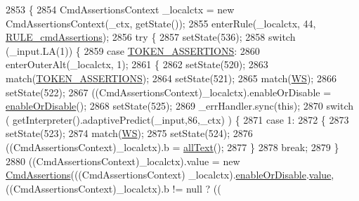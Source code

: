 \begin{DoxyCode}
2853                                                                                 \{
2854     CmdAssertionsContext \_localctx = \textcolor{keyword}{new} CmdAssertionsContext(\_ctx, getState());
2855     enterRule(\_localctx, 44, \hyperlink{classgov_1_1nasa_1_1jpf_1_1inspector_1_1client_1_1parser_1_1_console_grammar_parser_a4e8c3b6c02bd3ba2bdc1856db59019f5}{RULE\_cmdAssertions});
2856     \textcolor{keywordflow}{try} \{
2857       setState(536);
2858       \textcolor{keywordflow}{switch} (\_input.LA(1)) \{
2859       \textcolor{keywordflow}{case} \hyperlink{classgov_1_1nasa_1_1jpf_1_1inspector_1_1client_1_1parser_1_1_console_grammar_parser_a4a9f5da8ded8ec86d64dafbf8e21bb64}{TOKEN\_ASSERTIONS}:
2860         enterOuterAlt(\_localctx, 1);
2861         \{
2862         setState(520);
2863         match(\hyperlink{classgov_1_1nasa_1_1jpf_1_1inspector_1_1client_1_1parser_1_1_console_grammar_parser_a4a9f5da8ded8ec86d64dafbf8e21bb64}{TOKEN\_ASSERTIONS});
2864         setState(521);
2865         match(\hyperlink{classgov_1_1nasa_1_1jpf_1_1inspector_1_1client_1_1parser_1_1_console_grammar_parser_a6914a3a3adbc350b12a7df9d1b24abf1}{WS});
2866         setState(522);
2867         ((CmdAssertionsContext)\_localctx).enableOrDisable = \hyperlink{classgov_1_1nasa_1_1jpf_1_1inspector_1_1client_1_1parser_1_1_console_grammar_parser_aa5fa0739c6c5c8346b0476e6f75df5e4}{enableOrDisable}();
2868         setState(525);
2869         \_errHandler.sync(\textcolor{keyword}{this});
2870         \textcolor{keywordflow}{switch} ( getInterpreter().adaptivePredict(\_input,86,\_ctx) ) \{
2871         \textcolor{keywordflow}{case} 1:
2872           \{
2873           setState(523);
2874           match(\hyperlink{classgov_1_1nasa_1_1jpf_1_1inspector_1_1client_1_1parser_1_1_console_grammar_parser_a6914a3a3adbc350b12a7df9d1b24abf1}{WS});
2875           setState(524);
2876           ((CmdAssertionsContext)\_localctx).b = \hyperlink{classgov_1_1nasa_1_1jpf_1_1inspector_1_1client_1_1parser_1_1_console_grammar_parser_a9dfaeb28734c8b3f7ec5a7b81ed7d42e}{allText}();
2877           \}
2878           \textcolor{keywordflow}{break};
2879         \}
2880          ((CmdAssertionsContext)\_localctx).value =  \textcolor{keyword}{new} \hyperlink{classgov_1_1nasa_1_1jpf_1_1inspector_1_1client_1_1commands_1_1_cmd_assertions}{CmdAssertions}(((CmdAssertionsContext)
      \_localctx).\hyperlink{classgov_1_1nasa_1_1jpf_1_1inspector_1_1client_1_1parser_1_1_console_grammar_parser_aa5fa0739c6c5c8346b0476e6f75df5e4}{enableOrDisable}.\hyperlink{classgov_1_1nasa_1_1jpf_1_1inspector_1_1client_1_1parser_1_1_console_grammar_parser_1_1_enable_or_disable_context_a90d9102768769dc5e6c0dba0ee3f6adc}{value}, ((CmdAssertionsContext)\_localctx).b != null ? ((

\end{DoxyCode}
